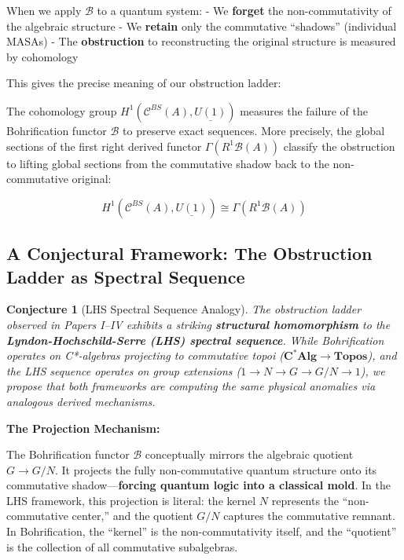 \documentclass[11pt]{article}
\newtheorem{conjecture}[theorem]{Conjecture}
\begin{document}
When we apply \(\mathcal{B}\) to a quantum system: - We \textbf{forget} the non-commutativity of the algebraic structure - We \textbf{retain} only the commutative ``shadows'' (individual MASAs) - The \textbf{obstruction} to reconstructing the original structure is measured by cohomology

This gives the precise meaning of our obstruction ladder:

The cohomology group \(H^1(\mathcal{C}^{BS}(A), \underline{U(1)})\) measures the failure of the Bohrification functor \(\mathcal{B}\) to preserve exact sequences. More precisely, the global sections of the first right derived functor \(\Gamma(R^1\mathcal{B}(A))\) classify the obstruction to lifting global sections from the commutative shadow back to the non-commutative original:

\[H^1(\mathcal{C}^{BS}(A), \underline{U(1)}) \cong \Gamma(R^1\mathcal{B}(A))\]

\subsection{A Conjectural Framework: The Obstruction
Ladder as Spectral Sequence}

\begin{conjecture}[LHS Spectral Sequence Analogy]\label{framework:spectral}
The obstruction ladder observed in Papers I--IV exhibits a striking \textbf{structural homomorphism} to the \textbf{Lyndon-Hochschild-Serre (LHS) spectral sequence}. While Bohrification operates on C*-algebras projecting to commutative topoi (\(\mathbf{C^*Alg} \to \mathbf{Topos}\)), and the LHS sequence operates on group extensions (\(1 \to N \to G \to G/N \to 1\)), we propose that both frameworks are computing the same physical anomalies via analogous derived mechanisms.
\end{conjecture}

\textbf{The Projection Mechanism:}

The Bohrification functor \(\mathcal{B}\) conceptually mirrors the algebraic quotient \(G \to G/N\). It projects the fully non-commutative quantum structure onto its commutative shadow---\textbf{forcing quantum logic into a classical mold}. In the LHS framework, this projection is literal: the kernel \(N\) represents the ``non-commutative center,'' and the quotient \(G/N\) captures the commutative remnant. In Bohrification, the ``kernel'' is the non-commutativity itself, and the ``quotient'' is the collection of all commutative subalgebras.
\end{document}
